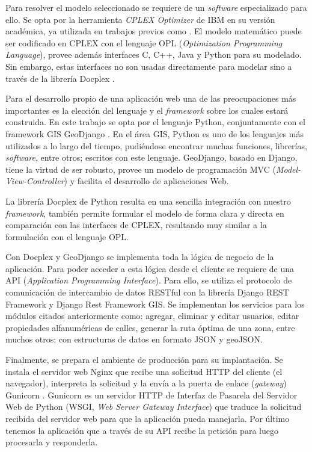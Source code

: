 \documentclass[conference,compsoc]{IEEEtran}
\begin{document}
Para resolver el modelo seleccionado se requiere de un \textit{software} especializado para ello. Se opta por la herramienta \textit{CPLEX Optimizer} de IBM \cite{CPLEXOptimizer} en su versión académica, ya utilizada en trabajos previos como \cite{Vecchi2016ACollection,Ramos2018TheApproaches,BabaeeTirkolaee2019DevelopingStudy}. El modelo matemático puede ser codificado en CPLEX con el lenguaje OPL ({\textit{Optimization Programming Language}}), provee además interfaces C, C++, Java y Python para su modelado. Sin embargo, estas interfaces no son usadas directamente para modelar sino a través de la librería Docplex \cite{Docplex}.

Para el desarrollo propio de una aplicación web una de las preocupaciones más importantes es la elección del lenguaje y el \textit{framework} sobre los cuales estará construida. En este trabajo se opta por el lenguaje Python, conjuntamente con el framework GIS GeoDjango \cite{GeoDjango}. En el área GIS, Python es uno de los lenguajes más utilizados a lo largo del tiempo, pudiéndose encontrar muchas funciones, librerías, \textit{software}, entre otros; escritos con este lenguaje. GeoDjango, basado en Django, tiene la virtud de ser robusto, provee un modelo de programación MVC (\textit{Model-View-Controller}) y facilita el desarrollo de aplicaciones Web.

La librería Docplex de Python resulta en una sencilla integración con nuestro \textit{framework}, también permite formular el modelo de forma clara y directa en comparación con las interfaces de CPLEX, resultando muy similar a la formulación con el lenguaje OPL.

Con Docplex y GeoDjango se implementa toda la lógica de negocio de la aplicación. Para poder acceder a esta lógica desde el cliente se requiere de una API (\textit{Application Programming Interface}). Para ello, se utiliza el protocolo de comunicación de intercambio de datos RESTful con la librería Django REST Framework y Django Rest Framework GIS. Se implementan los servicios para los módulos citados anteriormente como: agregar, eliminar y editar usuarios, editar propiedades alfanuméricas de calles, generar la ruta óptima de una zona, entre muchos otros; con estructuras de datos en formato JSON y geoJSON.

Finalmente, se prepara el ambiente de producción para su implantación. Se instala el servidor web Nginx \cite{NGINX} que recibe una solicitud HTTP del cliente (el navegador), interpreta la solicitud y la envía a la puerta de enlace (\textit{gateway}) Gunicorn \cite{Gunicorn}. Gunicorn es un servidor HTTP de Interfaz de Pasarela del Servidor Web de Python (WSGI, \textit{Web Server Gateway Interface}) que traduce la solicitud recibida del servidor web para que la aplicación pueda manejarla. Por último tenemos la aplicación que a través de su API recibe la petición para luego procesarla y responderla.
\end{document}
